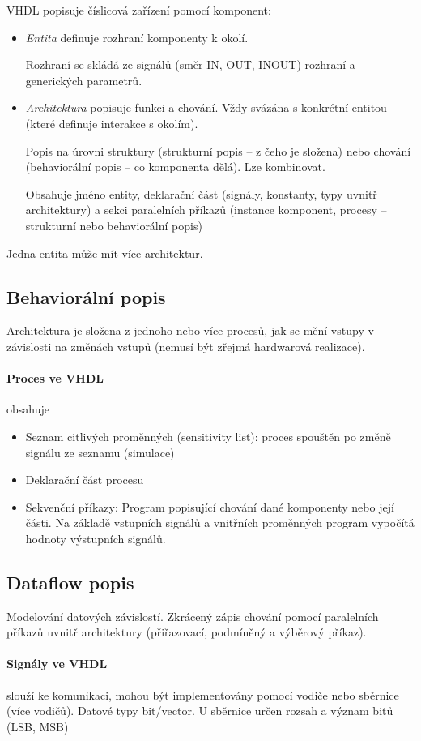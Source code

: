 \documentclass[a4paper, 11pt]{report}
\begin{document}
VHDL popisuje číslicová zařízení pomocí komponent:
\begin{itemize}
	\item \emph{Entita} definuje rozhraní komponenty k okolí.
	
	Rozhraní se skládá ze signálů (směr IN, OUT, INOUT) rozhraní a generických parametrů.
	\item \emph{Architektura} popisuje funkci a chování. Vždy svázána s konkrétní entitou (které definuje interakce s okolím).
	
	Popis na úrovni struktury (strukturní popis -- z čeho je složena) nebo chování (behaviorální popis -- co komponenta dělá). Lze kombinovat.
	
	Obsahuje jméno entity, deklarační část (signály, konstanty, typy uvnitř architektury) a sekci paralelních příkazů (instance komponent, procesy -- strukturní nebo behaviorální popis)
\end{itemize}
Jedna entita může mít více architektur.

\subsection{Behaviorální popis}
Architektura je složena z jednoho nebo více procesů, jak se mění vstupy v závislosti na změnách vstupů (nemusí být zřejmá hardwarová realizace).

\paragraph{Proces ve VHDL} obsahuje
\begin{itemize}
	\item Seznam citlivých proměnných (sensitivity list): proces spouštěn po změně signálu ze seznamu (simulace)
	\item Deklarační část procesu
	\item Sekvenční příkazy: Program popisující chování dané komponenty nebo její části. Na základě vstupních signálů a vnitřních proměnných program vypočítá hodnoty výstupních signálů.
\end{itemize}

\subsection{Dataflow popis}
Modelování datových závislostí. Zkrácený zápis chování pomocí paralelních příkazů uvnitř architektury (přiřazovací, podmíněný a výběrový příkaz).

\paragraph{Signály ve VHDL} slouží ke komunikaci, mohou být implementovány pomocí vodiče nebo sběrnice (více vodičů). Datové typy bit/vector. U sběrnice určen rozsah a význam bitů (LSB, MSB)
\end{document}
